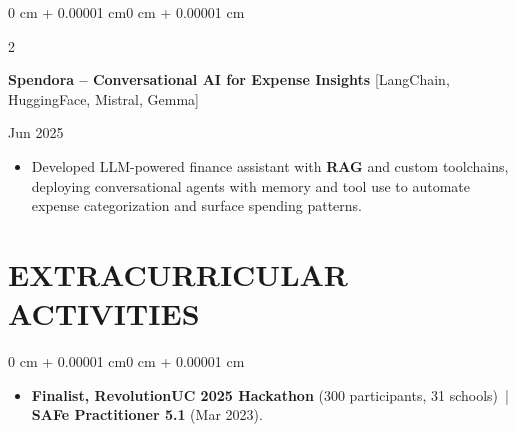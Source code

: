 \documentclass[10pt, letterpaper]{article}
\newenvironment{highlights}{
    \begin{itemize}[
        topsep=0.10 cm,
        parsep=0.06 cm,
        partopsep=0pt,
        itemsep=0.06 cm,
        leftmargin=12pt
    ]
}{
    \end{itemize}
}
\newenvironment{onecolentry}{
    \begin{adjustwidth}{0 cm + 0.00001 cm}{0 cm + 0.00001 cm}
}{
    \end{adjustwidth}
}
\newenvironment{twocolentry}[2][]{
    \onecolentry
    \def\secondColumn{#2}
    \setcolumnwidth{\fill, 4.5 cm}
    \begin{paracol}{2}
}{
    \switchcolumn \raggedleft \secondColumn
    \end{paracol}
    \endonecolentry
}
\begin{document}
\vspace{0.12 cm}

\begin{twocolentry}{Jun 2025}
\textbf{Spendora -- Conversational AI for Expense Insights} [LangChain, HuggingFace, Mistral, Gemma]
\end{twocolentry}
\begin{highlights}
  \item Developed LLM-powered finance assistant with \textbf{RAG} and custom toolchains, deploying conversational agents with memory and tool use to automate expense categorization and surface spending patterns.
\end{highlights}

\section{EXTRACURRICULAR ACTIVITIES}
\begin{onecolentry}
\begin{highlights}
  \item \textbf{Finalist, RevolutionUC 2025 Hackathon} (300 participants, 31 schools) \,|\, \textbf{SAFe Practitioner 5.1} (Mar 2023).
\end{highlights}
\end{onecolentry}
\end{document}
